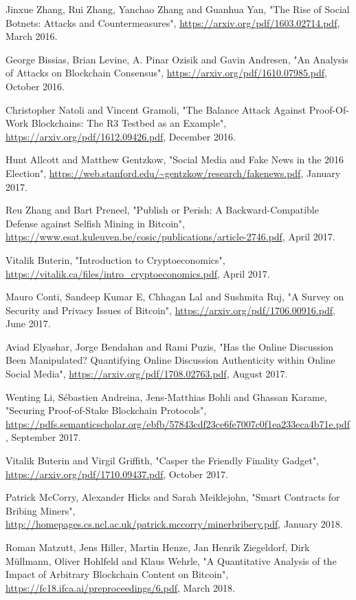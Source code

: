 \documentclass[12pt,a4paper]{article}
\begin{document}
\begin{thebibliography}{9}
Jinxue Zhang, Rui Zhang, Yanchao Zhang and Guanhua Yan,
"The Rise of Social Botnets: Attacks and Countermeasures",
\url{https://arxiv.org/pdf/1603.02714.pdf},
March 2016.

George Bissias, Brian Levine, A. Pinar Ozisik and Gavin Andresen,
"An Analysis of Attacks on Blockchain Consensus",
\url{https://arxiv.org/pdf/1610.07985.pdf},
October 2016.

Christopher Natoli and Vincent Gramoli,
"The Balance Attack Against Proof-Of-Work Blockchains: The R3 Testbed as an Example",
\url{https://arxiv.org/pdf/1612.09426.pdf},
December 2016.

Hunt Allcott and Matthew Gentzkow,
"Social Media and Fake News in the 2016 Election",
\url{https://web.stanford.edu/~gentzkow/research/fakenews.pdf},
January 2017.

Reu Zhang and Bart Preneel,
"Publish or Perish: A Backward-Compatible Defense against Selfish Mining in Bitcoin",
\url{https://www.esat.kuleuven.be/cosic/publications/article-2746.pdf},
April 2017.

Vitalik Buterin,
"Introduction to Cryptoeconomics",
\url{https://vitalik.ca/files/intro_cryptoeconomics.pdf},
April 2017.

Mauro Conti, Sandeep Kumar E, Chhagan Lal and Sushmita Ruj,
"A Survey on Security and Privacy Issues of Bitcoin",
\url{https://arxiv.org/pdf/1706.00916.pdf},
June 2017.

Aviad Elyashar, Jorge Bendahan and Rami Puzis,
"Has the Online Discussion Been Manipulated? Quantifying Online Discussion Authenticity within Online Social Media",
\url{https://arxiv.org/pdf/1708.02763.pdf},
August 2017.

Wenting Li, Sébastien Andreina, Jens-Matthias Bohli and Ghassan Karame,
"Securing Proof-of-Stake Blockchain Protocols",
\url{https://pdfs.semanticscholar.org/ebfb/57843cdf23ce6fe7007c0f1ea233eca4b71e.pdf},
September 2017.

Vitalik Buterin and Virgil Griffith,
"Casper the Friendly Finality Gadget",
\url{https://arxiv.org/pdf/1710.09437.pdf},
October 2017.

Patrick McCorry, Alexander Hicks and Sarah Meiklejohn,
"Smart Contracts for Bribing Miners",
\url{http://homepages.cs.ncl.ac.uk/patrick.mccorry/minerbribery.pdf},
January 2018.

Roman Matzutt, Jens Hiller, Martin Henze, Jan Henrik Ziegeldorf, Dirk Müllmann, Oliver Hohlfeld and Klaus Wehrle,
"A Quantitative Analysis of the Impact of Arbitrary Blockchain Content on Bitcoin",
\url{https://fc18.ifca.ai/preproceedings/6.pdf},
March 2018.


\end{thebibliography}
\end{document}
